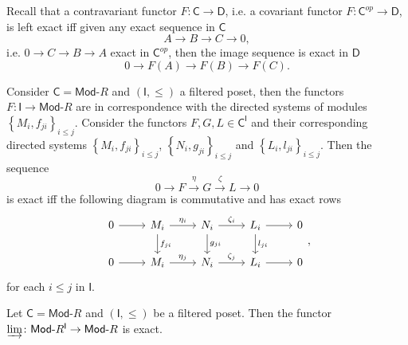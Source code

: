 \begin{rem}
	Recall that a contravariant functor $F\colon \mathsf{C} \to \mathsf{D}$, i.e. a covariant functor $F\colon \mathsf{C}^{op} \to \mathsf{D}$, 
	is left exact iff given any exact sequence in $\mathsf{C}$ 
	\begin{equation}
	A \to B \to C \to 0
	,\end{equation} 
	i.e. $0 \to C \to B \to A$ exact in $\mathsf{C}^{op}$, then the image sequence is exact in $\mathsf{D}$
	\begin{equation}
		0 \to F(A) \to F(B) \to F(C)
	.\end{equation} 
\end{rem}
\begin{rem}
Consider $\mathsf{C} = \mathsf{Mod}\text{-}R$ and $\left(\mathsf{I}, \leq \right)$ a filtered poset, then
the functors $F\colon \mathsf{I} \to \mathsf{Mod}\text{-}R$ are in correspondence
with the directed systems of modules
$\left\{ M_i, f_{ji} \right\}_{i \leq j }$.
Consider the functors $F, G, L \in \mathsf{C}^{\mathsf{I}}$ and their corresponding
directed systems $\left\{ M_i, f_{ji} \right\}_{i \leq j}$, $\left\{ N_i, g_{ji} \right\}_{i \leq j}$
and $\left\{ L_i, l_{ji} \right\}_{i \leq j}$.
Then the sequence 
\begin{equation}
0 \to F \xrightarrow{\eta} G \xrightarrow{\zeta} L \to 0
\end{equation} 
is exact iff the following diagram is commutative and has exact rows
\begin{equation}
\begin{tikzcd}
	0 \arrow[r, "", rightarrow] &
	M_i \arrow[r, "\eta_i", rightarrow] \arrow[d, "f_{ji}", rightarrow] &
	N_i \arrow[r, "\zeta_i", rightarrow] \arrow[d, "g_{ji}", rightarrow] &
	L_i \arrow[r, "", rightarrow] \arrow[d, "l_{ji}", rightarrow] &
	0 \\
	0 \arrow[r, "", rightarrow] &
	M_i \arrow[r, "\eta_j", rightarrow] &
	N_i \arrow[r, "\zeta_j", rightarrow] &
	L_i \arrow[r, "", rightarrow] &
	0
\end{tikzcd}
,\end{equation} 
for each $i \leq j$ in $\mathsf{I}$.
\end{rem} 

\begin{prop}
	Let $\mathsf{C} = \mathsf{Mod}\text{-}R$ and $\left(\mathsf{I}, \leq \right)$ be a filtered poset.
	Then the functor $\varinjlim\colon \mathsf{Mod}\text{-}R^{\mathsf{I}} \to \mathsf{Mod}\text{-}R$ is exact.
\end{prop} 

